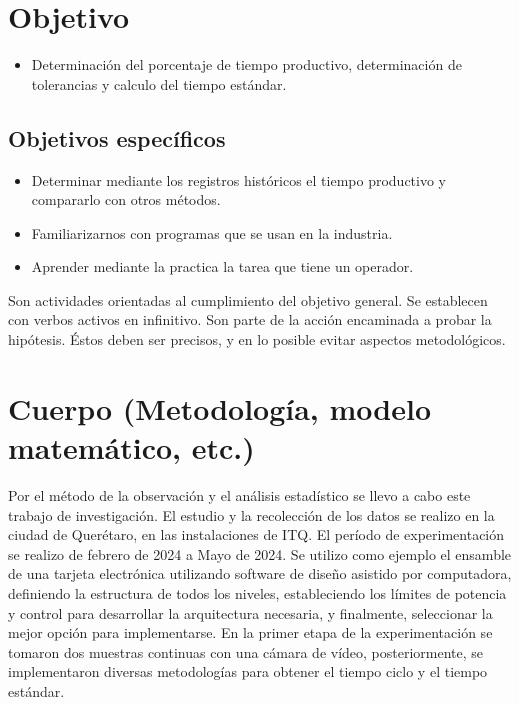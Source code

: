     \section{Objetivo}
    
    \begin{itemize}
        \item Determinación del porcentaje de tiempo productivo, determinación de tolerancias y calculo del tiempo estándar.
    \end{itemize}
    
    \subsection{Objetivos específicos }
    
    \begin{itemize}
        \item Determinar mediante los registros históricos el tiempo productivo y compararlo con otros métodos.
        \item Familiarizarnos con programas que se usan en la industria.
        \item Aprender mediante la practica la tarea que tiene un operador.
    \end{itemize}
    
    Son actividades orientadas al cumplimiento del objetivo general. Se establecen con verbos activos en infinitivo. Son parte de la acción encaminada a probar la hipótesis. Éstos deben ser precisos, y en lo posible evitar aspectos metodológicos.
    \section{Cuerpo (Metodología, modelo matemático, etc.)}
    
    Por el método de la observación y el análisis estadístico se llevo a cabo este trabajo de investigación.
    El estudio y la recolección de los datos se realizo en la ciudad de Querétaro, en las instalaciones de ITQ. 
    El período de experimentación se realizo de febrero de 2024 a Mayo de 2024.
    Se utilizo como ejemplo el ensamble de una tarjeta electrónica utilizando software de diseño asistido por computadora, definiendo la estructura de todos los niveles, estableciendo los límites de potencia y control para desarrollar la arquitectura necesaria, y finalmente, seleccionar la mejor opción para implementarse. 
    En la primer etapa de la experimentación se tomaron dos muestras continuas con una cámara de vídeo, posteriormente, se implementaron diversas metodologías para obtener el tiempo ciclo y el tiempo estándar. 
    
